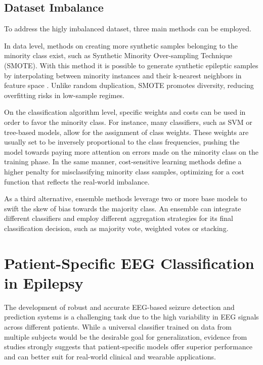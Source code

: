 \documentclass{article}
\begin{document}
				\subsection{Dataset Imbalance}
				
				To address the higly imbalanced dataset, 
				three main methods can be employed.

				In data level, methods on creating more synthetic
				samples belonging to the minority class exist, such as
				Synthetic Minority Over-sampling Technique (SMOTE).
				With this method it is possible to generate synthetic 
				epileptic samples
				by interpolating between minority instances 
				and their 
				k-nearest neighbors in 
				feature space \cite{SMOTEref}. 
				Unlike random duplication, 
				SMOTE promotes diversity, reducing overfitting risks in 
				low-sample regimes. 

				On the classification algorithm level, specific weights and costs 
				can be used in order to favor the minority class.
				For instance, many classifiers, 
				such as SVM or tree-based models, allow for the assignment 
				of class weights. 
				These weights are usually set to be inversely proportional
				to the class frequencies, 
				pushing the model towards paying more attention on
				errors made on the minority class on the training phase. 
				In the same manner, cost-sensitive learning 
				methods define a higher penalty for misclassifying 
				minority class samples, optimizing for a cost function 
				that reflects the real-world imbalance.

				As a third alternative, ensemble methods leverage two or more
				base models to swift the skew of bias towards the majority class.
				An ensemble can integrate different classifiers and employ different
				aggregation strategies for its final classification decision, such as 
				majority vote, weighted votes or stacking.



				\section{Patient-Specific EEG Classification in Epilepsy}
				\label{sec:need-patient-specific}

				The development of robust and accurate EEG-based seizure detection 
				and prediction systems is a challenging task due to the high 
				variability in EEG signals across different patients. 
				While a universal classifier trained on data from multiple subjects 
				would be the desirable goal for generalization, 
				evidence from studies strongly suggests that patient-specific 
				models offer superior performance and can better suit 
				for real-world clinical and wearable applications.
\end{document}
